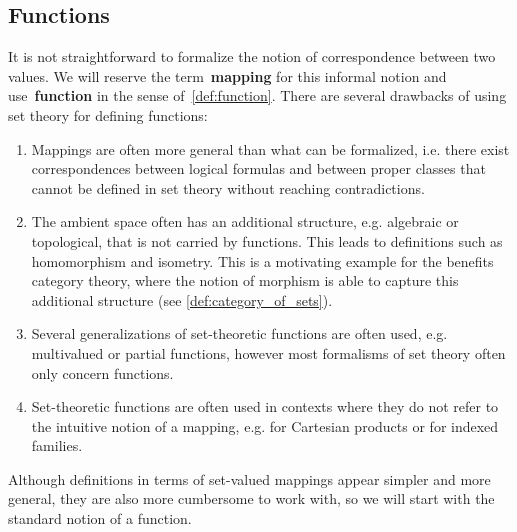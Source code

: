 \subsection{Functions}\label{subsec:functions}

\begin{remark}\label{remark:function_definition}
  It is not straightforward to formalize the notion of correspondence between two values. We will reserve the term~\textbf{mapping} for this informal notion and use~\textbf{function} in the sense of~\cref{def:function}. There are several drawbacks of using set theory for defining functions:
  \begin{enumerate}
    \item Mappings are often more general than what can be formalized, i.e. there exist correspondences between logical formulas and between proper classes that cannot be defined in set theory without reaching contradictions.
    \item The ambient space often has an additional structure, e.g. algebraic or topological, that is not carried by functions. This leads to definitions such as homomorphism and isometry. This is a motivating example for the benefits category theory, where the notion of morphism is able to capture this additional structure (see \cref{def:category_of_sets}).
    \item Several generalizations of set-theoretic functions are often used, e.g. multivalued or partial functions, however most formalisms of set theory often only concern functions.
    \item Set-theoretic functions are often used in contexts where they do not refer to the intuitive notion of a mapping, e.g. for Cartesian products or for indexed families.
  \end{enumerate}

  Although definitions in terms of set-valued mappings appear simpler and more general, they are also more cumbersome to work with, so we will start with the standard notion of a function.
\end{remark}

